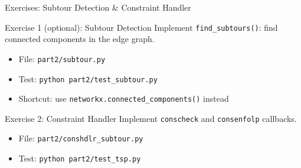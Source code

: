 \documentclass[aspectratio=169]{beamer}
\begin{document}
\begin{frame}{Exercises: Subtour Detection \& Constraint Handler}
\begin{block}{Exercise 1 (optional): Subtour Detection}
Implement \texttt{find\_subtours()}: find connected components in the edge graph.
\end{block}
\begin{itemize}
  \item File: \texttt{part2/subtour.py}
  \item Test: \texttt{python part2/test\_subtour.py}
  \item Shortcut: use \texttt{networkx.connected\_components()} instead
\end{itemize}

\medskip
\begin{block}{Exercise 2: Constraint Handler}
Implement \texttt{conscheck} and \texttt{consenfolp} callbacks.
\end{block}
\begin{itemize}
  \item File: \texttt{part2/conshdlr\_subtour.py}
  \item Test: \texttt{python part2/test\_tsp.py}
\end{itemize}
\end{frame}
\end{document}
